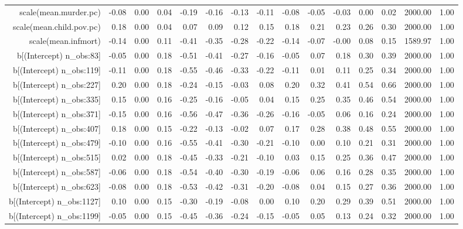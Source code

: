 \begin{table}[ht]
\begin{tabular}{rrrrrrrrrrrrrrr}
  scale(mean.murder.pc) & -0.08 & 0.00 & 0.04 & -0.19 & -0.16 & -0.13 & -0.11 & -0.08 & -0.05 & -0.03 & 0.00 & 0.02 & 2000.00 & 1.00 \\ 
  scale(mean.child.pov.pc) & 0.18 & 0.00 & 0.04 & 0.07 & 0.09 & 0.12 & 0.15 & 0.18 & 0.21 & 0.23 & 0.26 & 0.30 & 2000.00 & 1.00 \\ 
  scale(mean.infmort) & -0.14 & 0.00 & 0.11 & -0.41 & -0.35 & -0.28 & -0.22 & -0.14 & -0.07 & -0.00 & 0.08 & 0.15 & 1589.97 & 1.00 \\ 
  b[(Intercept) n\_obs:83] & -0.05 & 0.00 & 0.18 & -0.51 & -0.41 & -0.27 & -0.16 & -0.05 & 0.07 & 0.18 & 0.30 & 0.39 & 2000.00 & 1.00 \\ 
  b[(Intercept) n\_obs:119] & -0.11 & 0.00 & 0.18 & -0.55 & -0.46 & -0.33 & -0.22 & -0.11 & 0.01 & 0.11 & 0.25 & 0.34 & 2000.00 & 1.00 \\ 
  b[(Intercept) n\_obs:227] & 0.20 & 0.00 & 0.18 & -0.24 & -0.15 & -0.03 & 0.08 & 0.20 & 0.32 & 0.41 & 0.54 & 0.66 & 2000.00 & 1.00 \\ 
  b[(Intercept) n\_obs:335] & 0.15 & 0.00 & 0.16 & -0.25 & -0.16 & -0.05 & 0.04 & 0.15 & 0.25 & 0.35 & 0.46 & 0.54 & 2000.00 & 1.00 \\ 
  b[(Intercept) n\_obs:371] & -0.15 & 0.00 & 0.16 & -0.56 & -0.47 & -0.36 & -0.26 & -0.16 & -0.05 & 0.06 & 0.16 & 0.24 & 2000.00 & 1.00 \\ 
  b[(Intercept) n\_obs:407] & 0.18 & 0.00 & 0.15 & -0.22 & -0.13 & -0.02 & 0.07 & 0.17 & 0.28 & 0.38 & 0.48 & 0.55 & 2000.00 & 1.00 \\ 
  b[(Intercept) n\_obs:479] & -0.10 & 0.00 & 0.16 & -0.55 & -0.41 & -0.30 & -0.21 & -0.10 & 0.00 & 0.10 & 0.21 & 0.31 & 2000.00 & 1.00 \\ 
  b[(Intercept) n\_obs:515] & 0.02 & 0.00 & 0.18 & -0.45 & -0.33 & -0.21 & -0.10 & 0.03 & 0.15 & 0.25 & 0.36 & 0.47 & 2000.00 & 1.00 \\ 
  b[(Intercept) n\_obs:587] & -0.06 & 0.00 & 0.18 & -0.54 & -0.40 & -0.30 & -0.19 & -0.06 & 0.06 & 0.16 & 0.28 & 0.35 & 2000.00 & 1.00 \\ 
  b[(Intercept) n\_obs:623] & -0.08 & 0.00 & 0.18 & -0.53 & -0.42 & -0.31 & -0.20 & -0.08 & 0.04 & 0.15 & 0.27 & 0.36 & 2000.00 & 1.00 \\ 
  b[(Intercept) n\_obs:1127] & 0.10 & 0.00 & 0.15 & -0.30 & -0.19 & -0.08 & 0.00 & 0.10 & 0.20 & 0.29 & 0.39 & 0.51 & 2000.00 & 1.00 \\ 
  b[(Intercept) n\_obs:1199] & -0.05 & 0.00 & 0.15 & -0.45 & -0.36 & -0.24 & -0.15 & -0.05 & 0.05 & 0.13 & 0.24 & 0.32 & 2000.00 & 1.00 \\ 

\end{tabular}
\end{table}
